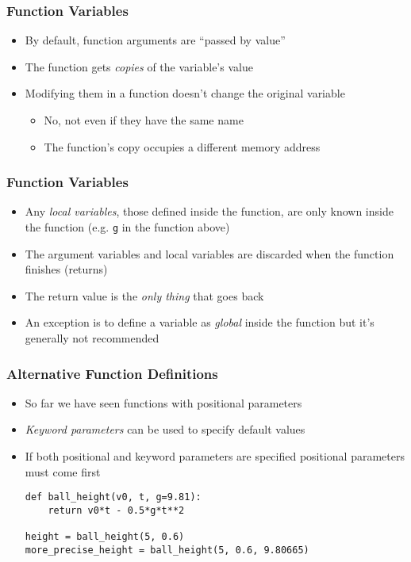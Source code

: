 \documentclass[english,14pt]{beamer}
\begin{document}
\begin{frame}
\frametitle{Function Variables}
\begin{itemize}
    \item By default, function arguments are ``passed by value''
    \item The function gets \textit{copies} of the variable's value
    \item Modifying them in a function doesn't change the original variable
	\begin{itemize}
		\item No, not even if they have the same name
		\item The function's copy occupies a different memory address
	\end{itemize}
    \end{itemize}
\end{frame}

\begin{frame}
\frametitle{Function Variables}
\begin{itemize}
    \item Any \textit{local variables}, those defined inside the function, are only known inside the function (e.g. \texttt{g} in the function above)
    \item The argument variables and local variables are discarded when the function finishes (returns)
    \item The return value is the \textit{only thing} that goes back
    \item An exception is to define a variable as \textit{global} inside the function but it's generally not recommended
\end{itemize}
\end{frame}


\begin{frame}[fragile]
\frametitle{Alternative Function Definitions}
\begin{itemize}
\item So far we have seen functions with positional parameters
\item \textit{Keyword parameters} can be used to specify default values
\item If both positional and keyword parameters are specified positional parameters must come first
\begin{lstlisting}[style=CStyle]
def ball_height(v0, t, g=9.81):    
    return v0*t - 0.5*g*t**2      

height = ball_height(5, 0.6)   
more_precise_height = ball_height(5, 0.6, 9.80665)  
\end{lstlisting}
\end{itemize}
\end{frame}
\end{document}
